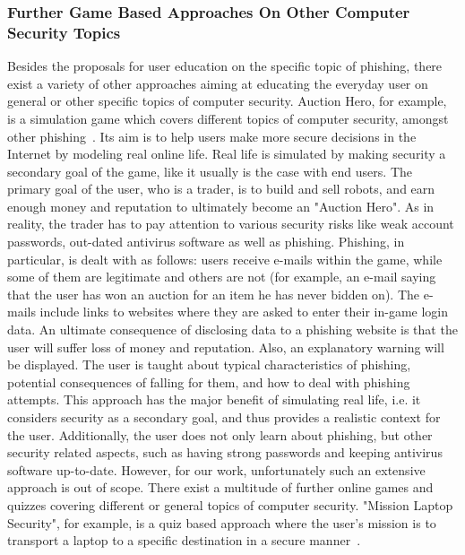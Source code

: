 \subsubsection{Further Game Based Approaches On Other Computer Security Topics}
Besides the proposals for user education on the specific topic of phishing, there exist a variety of other approaches aiming at educating the everyday user on general or other specific topics of computer security.
Auction Hero, for example, is a simulation game which covers different topics of computer security, amongst other phishing~\cite{chiasson2011auction}. 
Its aim is to help users make more secure decisions in the Internet by modeling real online life. 
Real life is simulated by making security a secondary goal of the game, like it usually is the case with end users. 
The primary goal of the user, who is a trader, is to build and sell robots, and earn enough money and reputation to ultimately become an "Auction Hero". 
As in reality, the trader has to pay attention to various security risks like weak account passwords, out-dated antivirus software as well as phishing. 
Phishing, in particular, is dealt with as follows: users receive e-mails within the game, while some of them are legitimate and others are not (for example, an e-mail saying that the user has won an auction for an item he has never bidden on). 
The e-mails include links to websites where they are asked to enter their in-game login data. 
An ultimate consequence of disclosing data to a phishing website is that the user will suffer loss of money and reputation. 
Also, an explanatory warning will be displayed. 
The user is taught about typical characteristics of phishing, potential consequences of falling for them, and how to deal with phishing attempts. 
This approach has the major benefit of simulating real life, i.e. it considers security as a secondary goal, and thus provides a realistic context for the user. 
Additionally, the user does not only learn about phishing, but other security related aspects, such as having strong passwords and keeping antivirus software up-to-date. 
However, for our work, unfortunately such an extensive approach is out of scope.
There exist a multitude of further online games and quizzes covering different or general topics of computer security.
"Mission Laptop Security", for example, is a quiz based approach where the user's mission is to transport a laptop to a specific destination in a secure manner~\cite{laptopsecurity}. 
